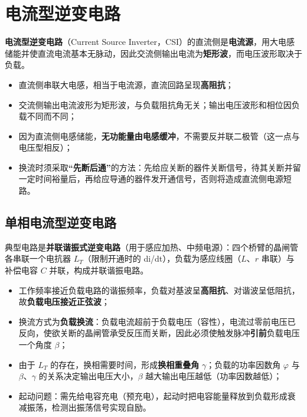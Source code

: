 
\section{电流型逆变电路}

\textbf{电流型逆变电路}（Current Source Inverter，CSI）的直流侧是\textbf{电流源}，用大电感储能并使直流电流基本无脉动，因此交流侧输出电流为\textbf{矩形波}，而电压波形取决于负载。

\begin{itemize}
  \item 直流侧串联大电感，相当于电流源，直流回路呈现\textbf{高阻抗}；
  \item 交流侧输出电流波形为矩形波，与负载阻抗角无关；输出电压波形和相位因负载不同而不同；
  \item 因为直流侧电感储能，\textbf{无功能量由电感缓冲}，不需要反并联二极管（这一点与电压型相反）；
  \item 换流时须采取\textbf{“先断后通”}的方法：先给应关断的器件关断信号，待其关断并留一定时间裕量后，再给应导通的器件发开通信号，否则将造成直流侧电源短路。
\end{itemize}

\subsection{单相电流型逆变电路}

典型电路是\textbf{并联谐振式逆变电路}（用于感应加热、中频电源）：四个桥臂的晶闸管各串联一个电抗器 $L_T$（限制开通时的 di/dt），负载为感应线圈（$L$、$r$ 串联）与补偿电容 $C$ 并联，构成并联谐振电路。

\begin{itemize}
  \item 工作频率接近负载电路的谐振频率，负载对基波呈\textbf{高阻抗}、对谐波呈低阻抗，故\textbf{负载电压接近正弦波}；
  \item 换流方式为\textbf{负载换流}：负载电流超前于负载电压（容性），电流过零前电压已反向，使欲关断的晶闸管承受反压而关断，因此必须使触发脉冲\textbf{引前}负载电压一个角度 $\beta$；
  \item 由于 $L_T$ 的存在，换相需要时间，形成\textbf{换相重叠角} $\gamma$；负载的功率因数角 $\varphi$ 与 $\beta$、$\gamma$ 的关系决定输出电压大小，$\beta$ 越大输出电压越低（功率因数越低）；
  \item 起动问题：需先给电容充电（预充电），起动时把电容能量释放到负载形成衰减振荡，检测出振荡信号实现自励。
\end{itemize}

